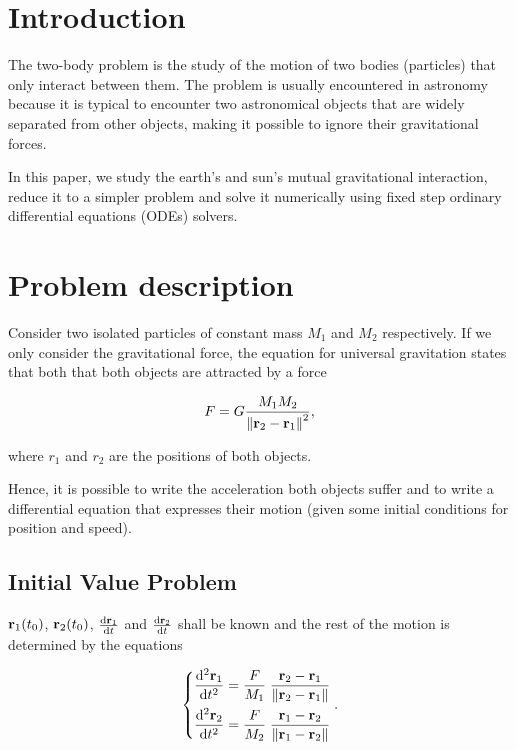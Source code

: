 \documentclass[12pt, onside]{article}
\newcommand{\vr}{{\vb{r}}}
\begin{document}

\newpage
\tableofcontents
\newpage

\section{Introduction}

    The two-body problem is the study of the motion of two bodies (particles)
that only interact between them.
The problem is usually encountered in astronomy because
it is typical to encounter two astronomical objects
that are widely separated from other objects,
making it possible to ignore their gravitational forces.

    In this paper, we study the earth's and sun's mutual gravitational interaction,
reduce it to a simpler problem
and solve it numerically using fixed step ordinary differential equations (ODEs) solvers.

\section{Problem description}

    Consider two isolated particles of constant mass $M_1$ and $M_2$ respectively.
If we only consider the gravitational force,
the equation for universal gravitation states that both that
both objects are attracted by a force

\begin{equation*}
    F = G\frac{M_1M_2}{\norm{\vr_2-\vr_1}^2},
\end{equation*}

\noindent
where $r_1$ and $r_2$ are the positions of both objects.

    Hence, it is possible to write the acceleration both objects suffer and
to write a differential equation that expresses their motion
(given some initial conditions for position and speed).

\subsection{Initial Value Problem}

$\vr_1(t_0)$, $\vr_2(t_0)$, $\dv{\vr_1}{t}(t_0)$ and $\dv{\vr_2}{t}(t_0)$ shall be known
and the rest of the motion is determined by the equations

\begin{equation*}
    \begin{dcases}
        \dv[2]{\vr_1}{t} = \frac{F}{M_1} \; \frac{\vr_2-\vr_1}{\norm{\vr_2-\vr_1}} \\
        \dv[2]{\vr_2}{t} = \frac{F}{M_2} \; \frac{\vr_1-\vr_2}{\norm{\vr_1-\vr_2}}
    \end{dcases}.
\end{equation*}
\end{document}
